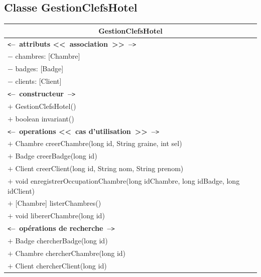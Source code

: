 \documentclass[11pt,article]{article}
\newcommand{\cmt}[1]{\texttt{<}\textbf{--~#1~--}\texttt{>}}
\begin{document}
  \subsection{Classe \textsf{GestionClefsHotel}}
  \begin{center}
	  \begin{longtable}{|p{15cm}|}
		  \hline
		  \multicolumn{1}{|c|}{{\Large \textsf{GestionClefsHotel}}} \\
		  \hline
		  \cmt{attributs <<~association~>>}\\
		  $-$ chambres: [Chambre] \\
		  $-$ badges: [Badge] \\
		  $-$ clients: [Client] \\
		  \hline
		  \cmt{constructeur} \\
		  $+$ GestionClefsHotel() \\
		  $+$ boolean invariant() \\
		  \cmt{operations <<~cas d'utilisation~>>} \\
		  $+$ Chambre creerChambre(long id, String graine, int sel) \\
		  $+$ Badge creerBadge(long id) \\
		  $+$ Client creerClient(long id, String nom, String prenom) \\
		  $+$ void enregistrerOccupationChambre(long idChambre, long idBadge, long idClient) \\
		  $+$ [Chambre] listerChambres() \\
		  $+$ void libererChambre(long id) \\
		  \cmt{opérations de recherche} \\
		  $+$ Badge chercherBadge(long id) \\
		  $+$ Chambre chercherChambre(long id) \\
		  $+$ Client chercherClient(long id) \\
		  \hline
	  \end{longtable}
  \end{center}
\end{document}
